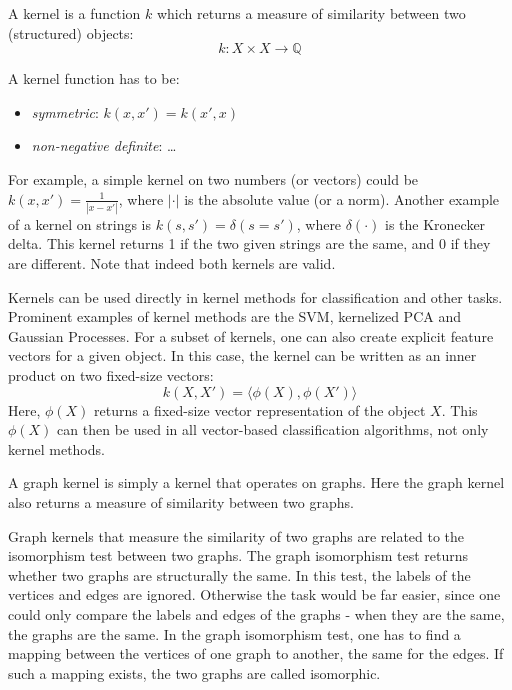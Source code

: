 A kernel is a function $k$ which returns a measure of similarity between two (structured) objects:
\begin{equation*}
k: X \times X \rightarrow \mathbb{Q}
\end{equation*}

A kernel function has to be:
\begin{itemize}
    \item{\textit{symmetric}: $k(x, x') = k(x', x)$}
    \item{\textit{non-negative definite}: \dots}
\end{itemize}

For example, a simple kernel on two numbers (or vectors) could be $k(x, x') = \frac{1}{| x - x' |}$, where $| \cdot |$ is the absolute value (or a norm). 
Another example of a kernel on strings is $k(s, s') = \delta(s = s')$, where $\delta(\cdot)$ is the Kronecker delta. This kernel returns 1 if the two given strings are the same, and 0 if they are different.
Note that indeed both kernels are valid.

Kernels can be used directly in kernel methods for classification and other tasks.
Prominent examples of kernel methods are the SVM, kernelized PCA and Gaussian Processes. For a subset of kernels, one can also create explicit feature vectors for a given object. In this case, the kernel can be written as an inner product on two fixed-size vectors:
\begin{equation*}
    k(X, X') = \langle \phi(X), \phi(X') \rangle
\end{equation*}
Here, $\phi(X)$ returns a fixed-size vector representation of the object $X$.
This $\phi(X)$ can then be used in all vector-based classification algorithms, not only kernel methods.

A graph kernel is simply a kernel that operates on graphs. Here the graph kernel also returns a measure of similarity between two graphs.

Graph kernels that measure the similarity of two graphs are related to the isomorphism test between two graphs.
The graph isomorphism test returns whether two graphs are structurally the same.
In this test, the labels of the vertices and edges are ignored. Otherwise the task would be far easier, since one could only compare the labels and edges of the graphs - when they are the same, the graphs are the same.
In the graph isomorphism test, one has to find a mapping between the vertices of one graph to another, the same for the edges.
If such a mapping exists, the two graphs are called isomorphic.

